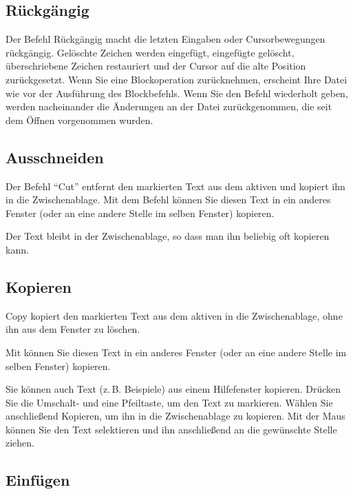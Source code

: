 \subsection{Rückgängig}
\label{sec:MI_UNDO}

Der Befehl Rückgängig macht die letzten Eingaben oder Cursorbewegungen
rückgängig. Gelöschte Zeichen werden eingefügt, eingefügte gelöscht,
überschriebene Zeichen restauriert und der Cursor auf die alte
Position zurückgesetzt. Wenn Sie eine Blockoperation zurücknehmen,
erscheint Ihre Datei wie vor der Ausführung des Blockbefehls. Wenn Sie
den Befehl wiederholt geben, werden nacheinander die Änderungen an der
Datei zurückgenommen, die seit dem Öffnen vorgenommen wurden.

\subsection{Ausschneiden}\label{sec:MI_CUT}
Der Befehl "`Cut"' entfernt den markierten Text aus dem aktiven
 und kopiert ihn in
die Zwischenablage. Mit dem Befehl 
können Sie diesen Text in ein anderes Fenster (oder an eine andere
Stelle im selben Fenster) kopieren.

Der Text bleibt in der Zwischenablage, so dass man ihn beliebig 
oft kopieren kann. 


\subsection{Kopieren}\label{sec:MI_COPY}
Copy kopiert den markierten Text aus dem aktiven
 in die Zwischenablage, ohne ihn
aus dem Fenster zu löschen.

Mit  können Sie diesen Text in ein 
anderes Fenster (oder an eine andere Stelle im selben Fenster) 
kopieren.  

Sie können auch Text (z.\,B. Beispiele) aus einem Hilfefenster 
kopieren. Drücken Sie die Umschalt- und eine Pfeiltaste, um 
den Text zu markieren. Wählen Sie anschließend Kopieren, 
um ihn in die Zwischenablage zu kopieren. Mit der Maus können 
Sie den Text selektieren und ihn anschließend an die gewünschte 
Stelle ziehen.

\subsection{Einfügen}
\label{sec:MI_PASTE}

